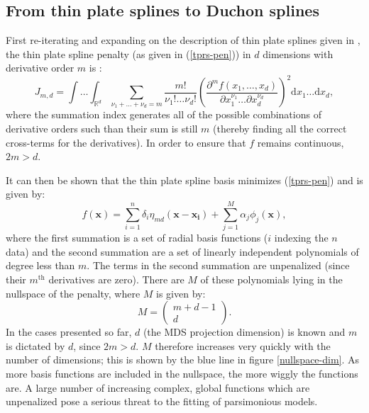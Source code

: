 \subsection{From thin plate splines to Duchon splines}
\label{gds-tprstoduchon}

First re-iterating and expanding on the description of thin plate splines given in , the thin plate spline penalty (as given in (\ref{tprs-pen})) in $d$ dimensions with derivative order $m$ is :
\begin{equation*}
J_{m,d} = \int \ldots \int_{\mathbb{R}^d} \sum_{\nu_1 + \dots + \nu_d=m} \frac{m!}{\nu_1! \dots \nu_d!} \left( \frac{\partial^m f \left (x_1,\dots,x_d \right )}{\partial x_1^{\nu_1} \ldots  \partial x_d^{\nu_d}} \right)^2 \text{d} x_1 \ldots  \text{d} x_d,
\end{equation*}
where the summation index generates all of the possible combinations of derivative orders such than their sum is still $m$ (thereby finding all the correct cross-terms for the derivatives). In order to ensure that $f$ remains continuous, $2m>d$.

It can then be shown that the thin plate spline basis minimizes (\ref{tprs-pen}) and is given by:
\begin{equation*}
f(\mathbf{x}) = \sum_{i=1}^n \delta_i \eta_{md}(\mathbf{x}-\mathbf{x_i}) + \sum_{j=1}^M \alpha_j \phi_j(\mathbf{x}),
\end{equation*}
where the first summation is a set of radial basis functions ($i$ indexing the $n$ data) and the second summation are a set of linearly independent polynomials of degree less than $m$. The terms in the second summation are unpenalized (since their $m^\text{th}$ derivatives are zero).  There are $M$ of these polynomials lying in the nullspace of the penalty, where $M$ is given by:
\begin{equation}
M=\begin{pmatrix} m+d-1 \\ d  \end{pmatrix}.
\label{gds-bigm}
\end{equation}
In the cases presented so far, $d$ (the MDS projection dimension) is known and $m$ is dictated by $d$, since $2m>d$. $M$ therefore increases very quickly with the number of dimensions; this is shown by the blue line in figure \ref{nullspace-dim}. As more basis functions are included in the nullspace, the more wiggly the functions are. A large number of increasing complex, global functions which are unpenalized pose a serious threat to the fitting of parsimonious models.

